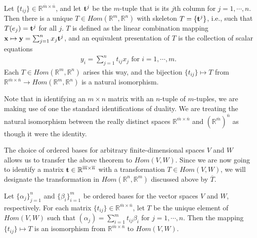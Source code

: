 \documentclass[12pt,letterpaper,reqno]{article}
\numberwithin{equation}{section}
\newcommand{\fixme}[1]{{\color{orange}{[#1]}}}
\begin{document}
\begin{thm}\label{thm:matrix_of_a_linear_transformation}
	Let $\{t_{ij}\} \in \mathbb{R}^{\overline{m} \times \overline{n}}$, and let ${\bf t}^j$ be the $m$-tuple that is its $j$th column for $j=1,\cdots,n$. Then there is a unique $T \in Hom(\mathbb{R}^m,\mathbb{R}^n)$ with skeleton $T=\{{\bf t}^j\}$, i.e., such that $T(e_j)={\bf t}^j$ for all $j$. $T$ is defined as the linear combination mapping ${\bf x} \mapsto {\bf y}=\sum_{j=1}^nx_j{\bf t}^j$, and an equivalent presentation of $T$ is the collection of scalar equations
	\begin{align*}
		y_i=\sum_{j=1}^nt_{ij}x_j \text{ for }i=1,\cdots,m.
	\end{align*}
	Each $T \in Hom(\mathbb{R}^m,\mathbb{R}^n)$ arises this way, and the bijection $\{t_{ij}\} \mapsto T$ from $\mathbb{R}^{\overline{m} \times \overline{n}} \to Hom(\mathbb{R}^m,\mathbb{R}^n)$ is a natural isomorphism.
\end{thm}

Note that in identifying an $m \times n$ matrix with an $n$-tuple of $m$-tuples, we are making use of one the standard identifications of duality. We are treating the natural isomorphism between the really distinct spaces $\mathbb{R}^{\overline{m} \times \overline{n}}$ and $(\mathbb{R}^{\overline{m}})^{\overline{n}}$ as though it were the identity.

\fixme{Simplify the previous theorem to make it more concise.}

The choice of ordered bases for arbitrary finite-dimensional spaces $V$ and $W$ allows us to transfer the above theorem to $Hom(V,W)$. Since we are now going to identify a matrix ${\bf t} \in \mathbb{R}^{\overline{m} \times \overline{n}}$ with a transformation $T \in Hom(V,W)$, we will designate the transformation in $Hom(\mathbb{R}^n,\mathbb{R}^m)$ discussed above by $\overline{T}$.

\begin{thm}
	Let $\{\alpha_j\}_{j=1}^n$ and $\{\beta_i\}_{i=1}^m$ be ordered bases for the vector spaces $V$ and $W$, respectively. For each matrix $\{t_{ij}\} \in \mathbb{R}^{\overline{m} \times \overline{n}}$, let $T$ be the unique element of $Hom(V,W)$ such that $(\alpha_j)=\sum_{i=1}^mt_{ij}\beta_i$ for $j=1,\cdots, n$. Then the mapping $\{t_{ij}\} \mapsto T$ is an isomorphism from $\mathbb{R}^{\overline{m} \times \overline{n}}$ to $Hom(V,W)$.
\end{thm}
\end{document}

